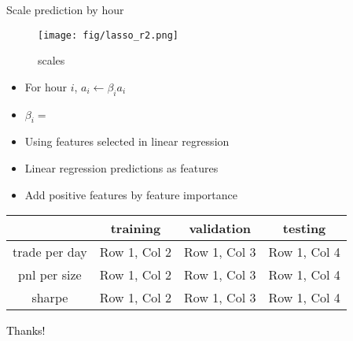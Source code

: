 \documentclass[10pt]{beamer}
\begin{document}
\begin{frame}{Scale prediction by hour}



\begin{figure}
    \centering
    \texttt{[image: fig/lasso\_r2.png]}
    \caption{scales}
\end{figure}

\begin{itemize}
    \item For hour $i$, $a_i \leftarrow \beta_i a_i$
    \item $\beta_i = $
    \item Using features selected in linear regression
    \item Linear regression predictions as features
    \item Add positive features by feature importance
\end{itemize}


\begin{table}[h!]
\centering
\begin{tabular}{c|c|c|c}
\hline
 & \textbf{training} & \textbf{validation} & \textbf{testing} \\ \hline
trade per day      & Row 1, Col 2      & Row 1, Col 3      & Row 1, Col 4      \\ \hline
pnl per size      & Row 1, Col 2      & Row 1, Col 3      & Row 1, Col 4      \\ \hline
sharpe      & Row 1, Col 2      & Row 1, Col 3      & Row 1, Col 4      \\ \hline
\end{tabular}
\end{table}


\end{frame}



\begin{frame}
\begin{center}
\begin{LARGE}
\textcolor{black}{Thanks!}
\end{LARGE}
\end{center}
\end{frame}







%


% 
\end{document}
